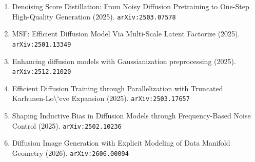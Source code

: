 \documentclass[11pt]{article}
\begin{document}
\begin{enumerate}
  \item Denoising Score Distillation: From Noisy Diffusion Pretraining to One-Step High-Quality Generation (2025). \texttt{arXiv:2503.07578}
  \item MSF: Efficient Diffusion Model Via Multi-Scale Latent Factorize (2025). \texttt{arXiv:2501.13349}
  \item Enhancing diffusion models with Gaussianization preprocessing (2025). \texttt{arXiv:2512.21020}
  \item Efficient Diffusion Training through Parallelization with Truncated Karhunen-Lo\textbackslash{}`eve Expansion (2025). \texttt{arXiv:2503.17657}
  \item Shaping Inductive Bias in Diffusion Models through Frequency-Based Noise
  Control (2025). \texttt{arXiv:2502.10236}
  \item Diffusion Image Generation with Explicit Modeling of Data Manifold Geometry (2026). \texttt{arXiv:2606.00094}
\end{enumerate}
\end{document}
